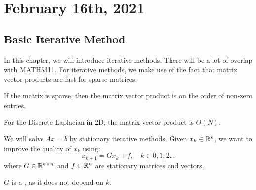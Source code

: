 \documentclass[../main/main.tex]{subfiles}
\begin{document}
\section{February 16th, 2021}
\subsection{Basic Iterative Method}
In this chapter, we will introduce iterative methods. There will be a lot of overlap with MATH5311. For iterative methods, we make use of the fact that matrix vector products are fast for sparse matrices.

\begin{remark}
If the matrix is sparse, then the matrix vector product is on the order of non-zero entries.
\end{remark}
\begin{example}
For the Discrete Laplacian in 2D, the matrix vector product is $O(N)$.
\end{example}
We will solve $Ax = b$ by stationary iterative methods. Given $x_{k}\in\mathbb{R}^{n}$, we want to improve the quality of $x_{k}$ using: \[
x_{k+1} = Gx_{k} + f, \quad k\in 0,1,2 \ldots
\] where $G\in\mathbb{R}^{n\times n}$ and $f\in\mathbb{R}^{n}$ are stationary matrices and vectors.
\begin{definition}
 $G$ is a , as it does not depend on $k$.
\end{definition}
\end{document}
